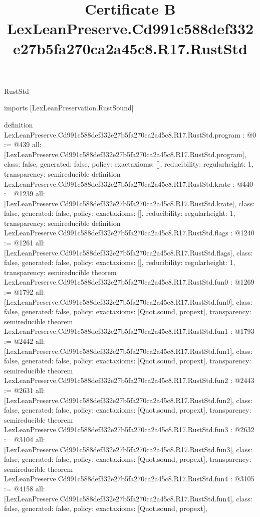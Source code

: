 \begin{lexlean}{RustStd}
\title{Certificate B LexLeanPreserve.Cd991c588def332e27b5fa270ca2a45c8.R17.RustStd}
\begin{coremodule}
imports [LexLeanPreservation.RustSound]

definition LexLeanPreserve.Cd991c588def332e27b5fa270ca2a45c8.R17.RustStd.program : @0 := @439 {
  all: [LexLeanPreserve.Cd991c588def332e27b5fa270ca2a45c8.R17.RustStd.program],
  class: false,
  generated: false,
  policy: exact{axioms: []},
  reducibility: regular{height: 1},
  transparency: semireducible
}
definition LexLeanPreserve.Cd991c588def332e27b5fa270ca2a45c8.R17.RustStd.krate : @440 := @1239 {
  all: [LexLeanPreserve.Cd991c588def332e27b5fa270ca2a45c8.R17.RustStd.krate],
  class: false,
  generated: false,
  policy: exact{axioms: []},
  reducibility: regular{height: 1},
  transparency: semireducible
}
definition LexLeanPreserve.Cd991c588def332e27b5fa270ca2a45c8.R17.RustStd.flags : @1240 := @1261 {
  all: [LexLeanPreserve.Cd991c588def332e27b5fa270ca2a45c8.R17.RustStd.flags],
  class: false,
  generated: false,
  policy: exact{axioms: []},
  reducibility: regular{height: 1},
  transparency: semireducible
}
theorem LexLeanPreserve.Cd991c588def332e27b5fa270ca2a45c8.R17.RustStd.fun0 : @1269 := @1792 {
  all: [LexLeanPreserve.Cd991c588def332e27b5fa270ca2a45c8.R17.RustStd.fun0],
  class: false,
  generated: false,
  policy: exact{axioms: [Quot.sound, propext]},
  transparency: semireducible
}
theorem LexLeanPreserve.Cd991c588def332e27b5fa270ca2a45c8.R17.RustStd.fun1 : @1793 := @2442 {
  all: [LexLeanPreserve.Cd991c588def332e27b5fa270ca2a45c8.R17.RustStd.fun1],
  class: false,
  generated: false,
  policy: exact{axioms: [Quot.sound, propext]},
  transparency: semireducible
}
theorem LexLeanPreserve.Cd991c588def332e27b5fa270ca2a45c8.R17.RustStd.fun2 : @2443 := @2631 {
  all: [LexLeanPreserve.Cd991c588def332e27b5fa270ca2a45c8.R17.RustStd.fun2],
  class: false,
  generated: false,
  policy: exact{axioms: [Quot.sound, propext]},
  transparency: semireducible
}
theorem LexLeanPreserve.Cd991c588def332e27b5fa270ca2a45c8.R17.RustStd.fun3 : @2632 := @3104 {
  all: [LexLeanPreserve.Cd991c588def332e27b5fa270ca2a45c8.R17.RustStd.fun3],
  class: false,
  generated: false,
  policy: exact{axioms: [Quot.sound, propext]},
  transparency: semireducible
}
theorem LexLeanPreserve.Cd991c588def332e27b5fa270ca2a45c8.R17.RustStd.fun4 : @3105 := @4158 {
  all: [LexLeanPreserve.Cd991c588def332e27b5fa270ca2a45c8.R17.RustStd.fun4],
  class: false,
  generated: false,
  policy: exact{axioms: [Quot.sound, propext]},
}
\end{coremodule}
\end{lexlean}
